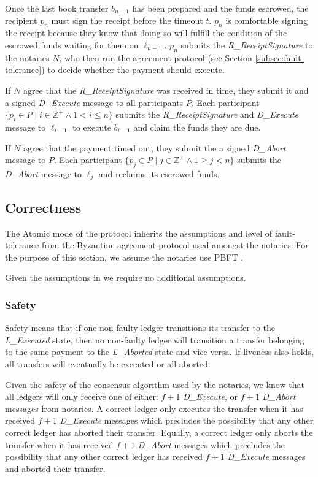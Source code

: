 \documentclass[letterpaper,twocolumn,10pt]{article}
\begin{document}
Once the last book transfer $b_{n-1}$ has been prepared and the funds escrowed, the recipient $p_n$ must sign the receipt before the timeout $t$. $p_n$ is comfortable signing the receipt because they know that doing so will fulfill the condition of the escrowed funds waiting for them on $\ell_{n-1}$. $p_n$ submits the \textit{R\_ReceiptSignature} to the notaries $N$, who then run the agreement protocol (see Section \ref{subsec:fault-tolerance}) to decide whether the payment should execute.

If $N$ agree that the \textit{R\_ReceiptSignature} was received in time, they submit it and a signed \textit{D\_Execute} message to all participants $P$. Each participant $ \{ p_i \in P \mid i \in \mathbb{Z}^+ \land 1 < i \leq n \} $ submits the \textit{R\_ReceiptSignature} and \textit{D\_Execute} message to $\ell_{i-1}$ to execute $b_{i-1}$ and claim the funds they are due.

If $N$ agree that the payment timed out, they submit the a signed \textit{D\_Abort} message to $P$. Each participant $ \{ p_j \in P \mid j \in \mathbb{Z}^+ \land 1 \geq j < n \} $ submits the \textit{D\_Abort} message to $\ell_j$ and reclaims its escrowed funds.


\subsection{Correctness}

The Atomic mode of the protocol inherits the assumptions and level of fault-tolerance from the Byzantine agreement protocol used amongst the notaries. For the purpose of this section, we assume the notaries use PBFT \cite{castro1999practical}.

Given the assumptions in \cite{castro1999practical} we require no additional assumptions.


\subsubsection{Safety}

Safety means that if one non-faulty ledger transitions its transfer to the \textit{L\_Executed} state, then no non-faulty ledger will transition a transfer belonging to the same payment to the \textit{L\_Aborted} state and vice versa. If liveness also holds, all transfers will eventually be executed or all aborted.

Given the safety of the consensus algorithm used by the notaries,
we know that all ledgers will only receive one of either: $f + 1$ \textit{D\_Execute}, or $f + 1$ \textit{D\_Abort} messages from notaries. A correct ledger only executes the transfer when it has received $f + 1$ \textit{D\_Execute} messages which precludes the possibility that any other correct ledger has aborted their transfer. Equally, a correct ledger only aborts the transfer when it has received $f + 1$ \textit{D\_Abort} messages which precludes the possibility that any other correct ledger has received $f + 1$ \textit{D\_Execute} messages and aborted their transfer.
\end{document}
